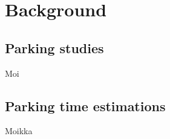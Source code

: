 \documentclass[../main.tex]{subfiles}
\begin{document}
\section{Background}
\justify
\subsection{Parking studies}
Moi \break

\subsection{Parking time estimations}
Moikka
\end{document}
